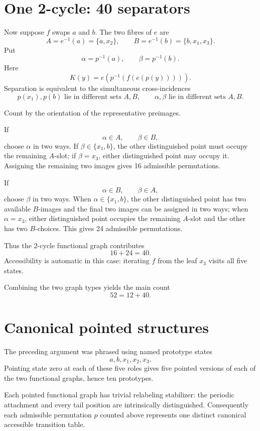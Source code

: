 \documentclass[10pt]{article}
\begin{document}
\section{One 2-cycle: 40 separators}

Now suppose $f$ swaps $a$ and $b$. The two fibres of $e$ are
\[
A=e^{-1}(a)=\{a,x_2\},
\qquad
B=e^{-1}(b)=\{b,x_1,x_3\}.
\]
Put
\[
\alpha=p^{-1}(a),\qquad \beta=p^{-1}(b).
\]
Here
\[
K(y)=e\!\left(p^{-1}(f(e(p(y))))\right).
\]
Separation is equivalent to the simultaneous cross-incidences
\begin{equation}
p(x_1),p(b)\text{ lie in different sets }A,B,
\qquad
\alpha,\beta\text{ lie in different sets }A,B.
\tag{4}
\end{equation}

Count by the orientation of the representative preimages.

If
\[
\alpha\in A,\qquad \beta\in B,
\]
choose \(\alpha\) in two ways. If \(\beta\in\{x_1,b\}\), the other distinguished point must occupy the remaining \(A\)-slot; if \(\beta=x_3\), either distinguished point may occupy it. Assigning the remaining two images gives 16 admissible permutations.

If
\[
\alpha\in B,\qquad \beta\in A,
\]
choose \(\beta\) in two ways. When \(\alpha\in\{x_1,b\}\), the other distinguished point has two available \(B\)-images and the final two images can be assigned in two ways; when \(\alpha=x_3\), either distinguished point occupies the remaining \(A\)-slot and the other has two \(B\)-choices. This gives 24 admissible permutations.

Thus the $2$-cycle functional graph contributes
\[
16+24=40.
\]
Accessibility is automatic in this case: iterating $f$ from the leaf $x_3$ visits all five states.

Combining the two graph types yields the main count
\[
\boxed{52=12+40}.
\]

\section{Canonical pointed structures}

The preceding argument was phrased using named prototype states
\[
a,b,x_1,x_2,x_3.
\]
Pointing state zero at each of these five roles gives five pointed versions of each of the two functional graphs, hence ten prototypes.

Each pointed functional graph has trivial relabeling stabilizer: the periodic attachment and every tail position are intrinsically distinguished. Consequently each admissible permutation $p$ counted above represents one distinct canonical accessible transition table.
\end{document}
